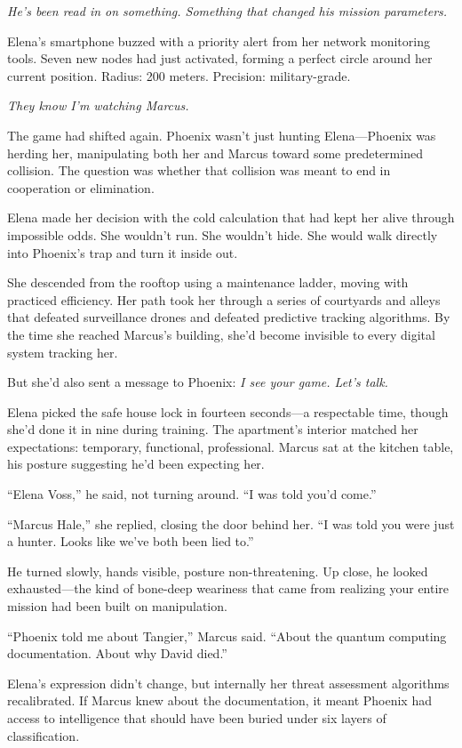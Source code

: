 \documentclass[12pt,letterpaper]{book}
\begin{document}
\emph{He's been read in on something. Something that changed his mission parameters.}

Elena's smartphone buzzed with a priority alert from her network monitoring tools. Seven new nodes had just activated, forming a perfect circle around her current position. Radius: 200 meters. Precision: military-grade.

\emph{They know I'm watching Marcus.}

The game had shifted again. Phoenix wasn't just hunting Elena---Phoenix was herding her, manipulating both her and Marcus toward some predetermined collision. The question was whether that collision was meant to end in cooperation or elimination.

Elena made her decision with the cold calculation that had kept her alive through impossible odds. She wouldn't run. She wouldn't hide. She would walk directly into Phoenix's trap and turn it inside out.

She descended from the rooftop using a maintenance ladder, moving with practiced efficiency. Her path took her through a series of courtyards and alleys that defeated surveillance drones and defeated predictive tracking algorithms. By the time she reached Marcus's building, she'd become invisible to every digital system tracking her.

But she'd also sent a message to Phoenix: \emph{I see your game. Let's talk.}

Elena picked the safe house lock in fourteen seconds---a respectable time, though she'd done it in nine during training. The apartment's interior matched her expectations: temporary, functional, professional. Marcus sat at the kitchen table, his posture suggesting he'd been expecting her.

``Elena Voss,'' he said, not turning around. ``I was told you'd come.''

``Marcus Hale,'' she replied, closing the door behind her. ``I was told you were just a hunter. Looks like we've both been lied to.''

He turned slowly, hands visible, posture non-threatening. Up close, he looked exhausted---the kind of bone-deep weariness that came from realizing your entire mission had been built on manipulation.

``Phoenix told me about Tangier,'' Marcus said. ``About the quantum computing documentation. About why David died.''

Elena's expression didn't change, but internally her threat assessment algorithms recalibrated. If Marcus knew about the documentation, it meant Phoenix had access to intelligence that should have been buried under six layers of classification.
\end{document}
